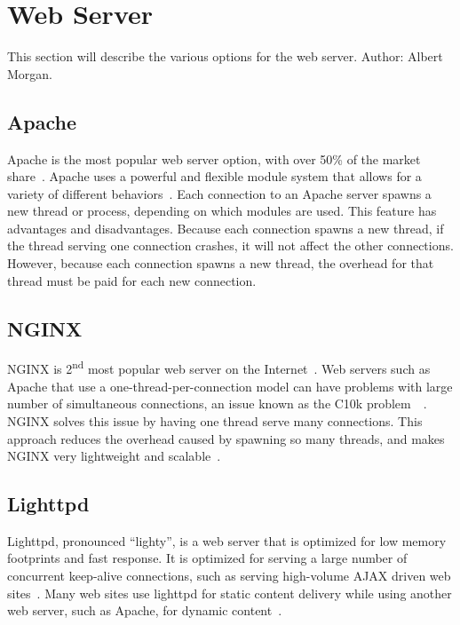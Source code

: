 \documentclass[10pt,draftclsnofoot,onecolumn]{IEEEtran}
\begin{document}
	\section{Web Server}
	This section will describe the various options for the web server. Author: Albert Morgan.

	\subsection{Apache}
	Apache is the most popular web server option, with over 50\% of the market share~\cite{apache-usage-statistics}.
	Apache uses a powerful and flexible module system that allows for a variety of different behaviors~\cite{apache-vs-nginx-practical-considerations}.
	Each connection to an Apache server spawns a new thread or process, depending on which modules are used.
	This feature has advantages and disadvantages.
	Because each connection spawns a new thread, if the thread serving one connection crashes, it will not affect the other connections.
	However, because each connection spawns a new thread, the overhead for that thread must be paid for each new connection.

	\subsection{NGINX}
	NGINX is 2\textsuperscript{nd} most popular web server on the Internet~\cite{nginx-usage-statistics}.
	Web servers such as Apache that use a one-thread-per-connection model can have problems with large number of simultaneous connections, an issue known as the C10k problem~\cite{apache-vs-nginx-practical-considerations}~\cite{c10k-problem}.
	NGINX solves this issue by having one thread serve many connections.
	This approach reduces the overhead caused by spawning so many threads, and makes NGINX very lightweight and scalable~\cite{nginx-vs-apache-our-view}.
	
	\subsection{Lighttpd}
	Lighttpd, pronounced ``lighty'', is a web server that is optimized for low memory footprints and fast response.
	It is optimized for serving a large number of concurrent keep-alive connections, such as serving high-volume AJAX driven web sites~\cite{lighttpd}. Many web sites use lighttpd for static content delivery while using another web server, such as Apache,
	for dynamic content~\cite{powered-by-lighttpd}.
\end{document}
